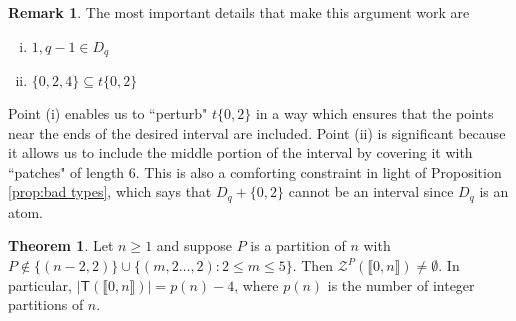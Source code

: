 \documentclass{report}
\newcommand{\Z}{\mathcal{Z}}
\newcommand{\llb}{\llbracket}
\newcommand{\rrb}{\rrbracket}
\renewcommand{\:}{\text{:}}
\theoremstyle{definition}
\newtheorem{thm}[defn]{Theorem}
\newtheorem{rk}[defn]{Remark}
\begin{document}
\begin{rk}
The most important details that make this argument work are
\begin{enumerate}[(i)]
\item $1,q-1\in D_q$
\item $\{0,2,4\} \subseteq t\{0,2\}$
\end{enumerate}
Point (i) enables us to ``perturb" $t\{0,2\}$ in a way which ensures that the points near the ends of the desired interval are included.
Point (ii) is significant because it allows us to include the middle portion of the interval by covering it with ``patches" of length $6$.
This is also a comforting constraint in light of Proposition \ref{prop:bad types}, which says that $D_q + \{0,2\}$ cannot be an interval since $D_q$ is an atom.
\end{rk}


\begin{thm} \label{thm:good types}
Let $n\ge 1$ and suppose $P$ is a partition of $n$ with $P \notin \{(n-2,2)\} \cup \{ (m,2\dots,2) : 2\le m \le 5\}$.
Then $\Z^P(\llb 0,n \rrb) \neq \emptyset$.
In particular, $|\mathsf{T}(\llb 0,n \rrb)| = p(n)-4$, where $p(n)$ is the number of integer partitions of $n$.
\end{thm}
\end{document}
